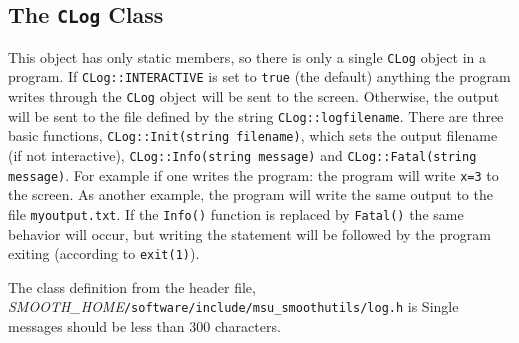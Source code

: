 \documentclass[UserManual.tex]{subfiles}
\begin{document}
\begin{sloppypar}
\subsection{The {\tt CLog} Class}\label{subsec:CLog}
This object has only static members, so there is only a single {\tt CLog} object in a program. If {\tt CLog::INTERACTIVE} is set to {\tt true} (the default) anything the program writes through the {\tt CLog} object will be sent to the screen. Otherwise, the output will be sent to the file defined by the string {\tt CLog::logfilename}. There are three basic functions, {\tt CLog::Init(string filename)}, which sets the output filename (if not interactive), {\tt CLog::Info(string message)} and {\tt CLog::Fatal(string message)}. For example if one writes the program:
\vspace*{-8pt}
the program will write {\tt x=3} to the screen. As another example, the program
\vspace*{-8pt}
will write the same output to the file {\tt myoutput.txt}. If the {\tt Info()} function is replaced by {\tt Fatal()} the same behavior will occur, but writing the statement will be followed by the program exiting (according to {\tt exit(1)}). 

The class definition from the header file, \textit{SMOOTH\_HOME}{\tt /software/include/msu\_smoothutils/log.h} is
\vspace*{-8pt}
Single messages should be less than 300 characters. 


\end{sloppypar}
\end{document}
